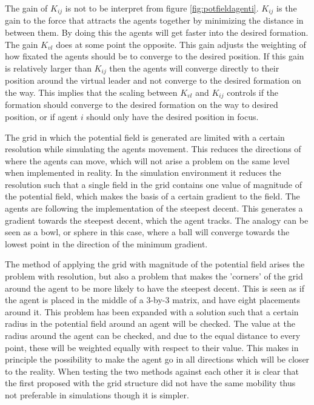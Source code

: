The gain of $K_{ij}$ is not to be interpret from figure \ref{fig:potfieldagenti}. $K_{ij}$ is the gain to the force that attracts the agents together by minimizing the distance in between them. By doing this the agents will get faster into the desired formation. The gain $K_{vl}$ does at some point the opposite. This gain adjusts the weighting of how fixated the agents should be to converge to the desired position. If this gain is relatively larger than $K_{ij}$ then the agents will converge directly to their position around the virtual leader and not converge to the desired formation on the way. This implies that the scaling between $K_{vl}$ and $K_{ij}$ controls if the formation should converge to the desired formation on the way to desired position, or if agent $i$ should only have the desired position in focus.

The grid in which the potential field is generated are limited with a certain resolution while simulating the agents movement. This reduces the directions of where the agents can move, which will not arise a problem on the same level when implemented in reality. In the simulation environment it reduces the resolution such that a single field in the grid contains one value of magnitude of the potential field, which makes the basis of a certain gradient to the field. The agents are following the implementation of the steepest decent. This generates a gradient towards the steepest decent, which the agent tracks. The analogy can be seen as a bowl, or sphere in this case, where a ball will converge towards the lowest point in the direction of the minimum gradient.

The method of applying the grid with magnitude of the potential field arises the problem with resolution, but also a problem that makes the 'corners' of the grid around the agent to be more likely to have the steepest decent. This is seen as if the agent is placed in the middle of a 3-by-3 matrix, and have eight placements around it. This problem has been expanded with a solution such that a certain radius in the potential field around an agent will be checked. The value at the radius around the agent can be checked, and due to the equal distance to every point, these will be weighted equally with respect to their value. This makes in principle the possibility to make the agent go in all directions which will be closer to the reality. When testing the two methods against each other it is clear that the first proposed with the grid structure did not have the same mobility thus not preferable in simulations though it is simpler.

